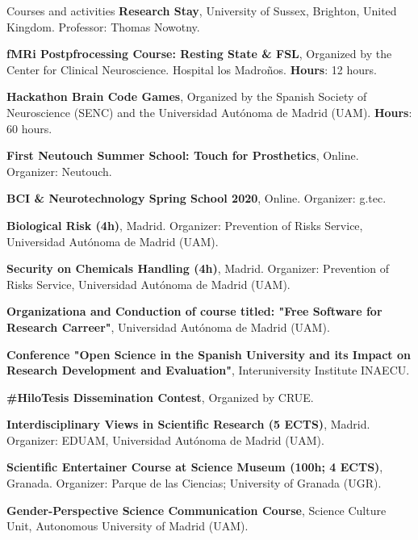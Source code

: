 \begin{rubric}{Courses and activities}
 \textbf{Research Stay}, University of Sussex, Brighton, United Kingdom. Professor: Thomas Nowotny.


\entry*[February 2024] \textbf{fMRi Postpfrocessing Course: Resting State \& FSL}, Organized by the Center for Clinical Neuroscience. Hospital los Madroños. \textbf{Hours}: 12 hours.

\entry*[October 2021] \textbf{Hackathon Brain Code Games}, Organized by the Spanish Society of Neuroscience (SENC) and the Universidad Autónoma de Madrid (UAM). \textbf{Hours}: 60 hours.

\entry*[October 2020] \textbf{First Neutouch Summer School: Touch for Prosthetics}, Online. Organizer: Neutouch.

\entry*[April 2020] \textbf{BCI \& Neurotechnology Spring School 2020}, Online. Organizer: g.tec.


 \entry*[June 18, 2019] \textbf{Biological Risk (4h)}, Madrid. Organizer: Prevention of Risks Service, Universidad Autónoma de Madrid (UAM).

 \entry*[July 4, 2019] \textbf{Security on Chemicals Handling (4h)}, Madrid. Organizer: Prevention of Risks Service, Universidad Autónoma de Madrid (UAM).



\entry*[March 4,11, 2024] \textbf{Organizationa and Conduction of course titled: "Free Software for Research Carreer"}, Universidad Autónoma de Madrid (UAM).

\entry*[January 25, 2023] \textbf{Conference "Open Science in the Spanish University and its Impact on Research Development and Evaluation"}, Interuniversity Institute INAECU.

\entry*[May 2021] \textbf{\#HiloTesis Dissemination Contest}, Organized by CRUE.

 \textbf{Interdisciplinary Views in Scientific Research (5 ECTS)}, Madrid. Organizer: EDUAM, Universidad Autónoma de Madrid (UAM).

 \textbf{Scientific Entertainer Course at Science Museum (100h; 4 ECTS)}, Granada. Organizer: Parque de las Ciencias; University of Granada (UGR).

\entry*[February 2024] \textbf{Gender-Perspective Science Communication Course}, Science Culture Unit, Autonomous University of Madrid (UAM).


\end{rubric}
